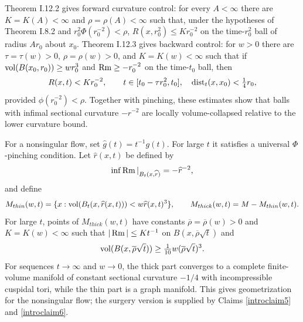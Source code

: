 Theorem I.12.2 gives forward curvature control: for every $A<\infty$ there
are $K=K(A)<\infty$ and $\rho=\rho(A)<\infty$ such that, under the
hypotheses of Theorem I.8.2 and
$r_0^2\Phi(r_0^{-2})<\rho$,
$R(x,r_0^2)\leq Kr_0^{-2}$ on the time-$r_0^2$ ball of radius $Ar_0$
about $x_0$.  Theorem I.12.3 gives backward control: for $w>0$ there are
$\tau=\tau(w)>0$, $\rho=\rho(w)>0$, and $K=K(w)<\infty$ such that if
$\operatorname{vol}(B(x_0,r_0))\geq wr_0^3$ and $\operatorname{Rm}\geq-r_0^{-2}$ on the time-$t_0$
ball, then
\[
R(x,t)<Kr_0^{-2},\qquad
t\in[t_0-\tau r_0^2,t_0],\quad
\operatorname{dist}_t(x,x_0)<\tfrac14r_0,
\]
provided $\phi(r_0^{-2})<\rho$.  Together with pinching, these estimates
show that balls with infimal sectional curvature $-r^{-2}$ are locally
volume-collapsed relative to the lower curvature bound.

For a nonsingular flow, set $\widehat g(t)=t^{-1}g(t)$.  For large $t$ it
satisfies a universal $\Phi$-pinching condition.  Let $\widehat r(x,t)$ be
defined by
\[
\inf\operatorname{Rm}|_{B_t(x,\widehat r)}=-\widehat r^{-2},
\]
and define
\[
M_{thin}(w,t)=\{x:\operatorname{vol}(B_t(x,\widehat r(x,t)))<w\widehat r(x,t)^3\},
\qquad M_{thick}(w,t)=M-M_{thin}(w,t).
\]
For large $t$, points of $M_{thick}(w,t)$ have constants
$\overline\rho=\overline\rho(w)>0$ and $K=K(w)<\infty$ such that
$|\operatorname{Rm}|\leq Kt^{-1}$ on $B(x,\overline\rho\sqrt t)$ and
\[
\operatorname{vol}(B(x,\overline\rho\sqrt t))
\geq \tfrac1{10}w(\overline\rho\sqrt t)^3.
\]
For sequences $t\rightarrow\infty$ and $w\rightarrow0$, the thick part
converges to a complete finite-volume manifold of constant sectional
curvature $-1/4$ with incompressible cuspidal tori, while the thin part is a
graph manifold.  This gives geometrization for the nonsingular flow; the
surgery version is supplied by Claims \ref{introclaim5} and
\ref{introclaim6}.

